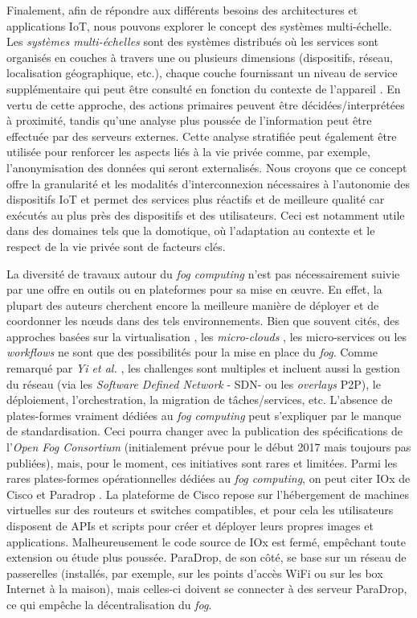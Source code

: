Finalement, afin de répondre aux différents besoins des architectures et applications IoT, nous pouvons explorer le concept des systèmes multi-échelle. Les \textit {systèmes multi-échelles} sont des systèmes distribués où les services sont organisés en couches à travers une ou plusieurs dimensions (dispositifs, réseau, localisation géographique, etc.), chaque couche fournissant un niveau de service supplémentaire qui peut être consulté en fonction du contexte de l'appareil \cite{Rottenberg2012,Rottenberg2014}.  En vertu de cette approche, des actions primaires peuvent être décidées/interprétées à proximité, tandis qu'une analyse plus poussée de l'information peut être effectuée par des serveurs externes. Cette analyse stratifiée peut également être utilisée pour renforcer les aspects liés à la vie privée comme, par exemple, l'anonymisation des données qui seront externalisés. Nous croyons que ce concept offre la granularité et les modalités d'interconnexion nécessaires à l'autonomie des dispositifs IoT et permet des services plus réactifs et de meilleure qualité car exécutés au plus près des dispositifs et des utilisateurs. Ceci est notamment utile dans des domaines tels que la domotique, où l'adaptation au contexte et le respect de la vie privée sont de facteurs clés.

La diversité de travaux autour du \textit{fog computing} n'est pas nécessairement suivie par une offre en outils ou en plateformes pour sa mise en {\oe}uvre. En effet, la plupart des auteurs cherchent encore la meilleure manière de déployer et de coordonner les n{\oe}uds dans des tels environnements. Bien que souvent cités, des approches basées sur la virtualisation \cite{Satyanarayanan09}, les \textit{micro-clouds} \cite{Elkhatib2017},  les micro-services \cite{Villari2016} ou les \textit{workflows} \cite{Hao2017} ne sont que des possibilités pour la mise en place du \textit{fog}. Comme remarqué par \textit{Yi et al.} \cite{Yi2015}, les challenges sont multiples et incluent aussi la gestion du réseau (via les \textit{Software Defined Network} - SDN- ou les \textit{overlays} P2P), le déploiement, l'orchestration, la migration de tâches/services, etc. L'absence de plates-formes vraiment dédiées au \textit{fog computing} peut s'expliquer par le manque de standardisation. Ceci pourra changer avec la publication des spécifications de l'\textit{Open Fog Consortium} (initialement prévue pour le début 2017 mais toujours pas publiées), mais, pour le moment, ces initiatives sont rares et limitées. Parmi les rares plates-formes opérationnelles dédiées au \textit{fog computing}, on peut citer IOx de Cisco \cite{IOx2017} et Paradrop \cite{Willis2014}. La plateforme de Cisco repose sur l'hébergement de machines virtuelles sur des routeurs et switches compatibles, et pour cela les utilisateurs disposent de APIs et scripts pour créer et déployer leurs propres images et applications. Malheureusement le code source de IOx est fermé, empêchant toute extension ou étude plus poussée. ParaDrop, de son côté, se base sur un réseau de passerelles (installés, par exemple, sur les points d'accès WiFi ou sur les box Internet à la maison), mais celles-ci doivent se connecter à des serveur ParaDrop, ce qui empêche la décentralisation du \textit{fog}. 

